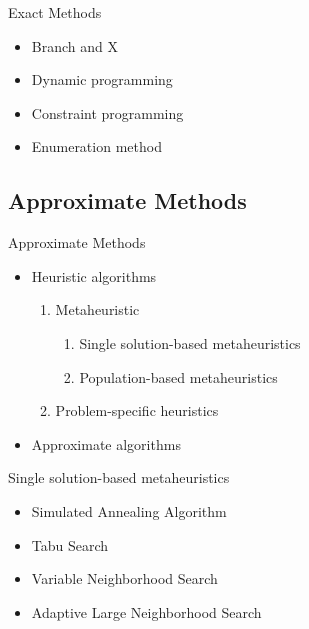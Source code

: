     \begin{frame}{Exact Methods}
      \Large
      \begin{spacing}{1.5}
        \begin{itemize}
          \item Branch and X
          \item<+-> Dynamic programming
          \item<+-> Constraint programming
          \item<+-> Enumeration method
        \end{itemize}
      \end{spacing}
    \end{frame}



    \subsection{Approximate Methods}
    \frame{\sectionpage}

    \begin{frame}{Approximate Methods}
      \Large
      \begin{itemize}
        \item Heuristic algorithms
        \vspace{4pt}
        \begin{enumerate}
          \item<+->  Metaheuristic
            \begin{enumerate}
              \item<+>[*] Single solution-based metaheuristics
              \item<+>[*] Population-based metaheuristics
            \end{enumerate}
          \vspace{4pt}
          \item<+->  Problem-specific heuristics
        \end{enumerate}
        \item<+-> Approximate algorithms
      \end{itemize}
    \end{frame}

    \begin{frame}{Single solution-based metaheuristics}
      \Large
      \begin{spacing}{2}
        \begin{itemize}
          \item Simulated Annealing Algorithm
          \item Tabu Search
          \item Variable Neighborhood Search
          \item Adaptive Large Neighborhood Search
        \end{itemize}
      \end{spacing}
    \end{frame}

